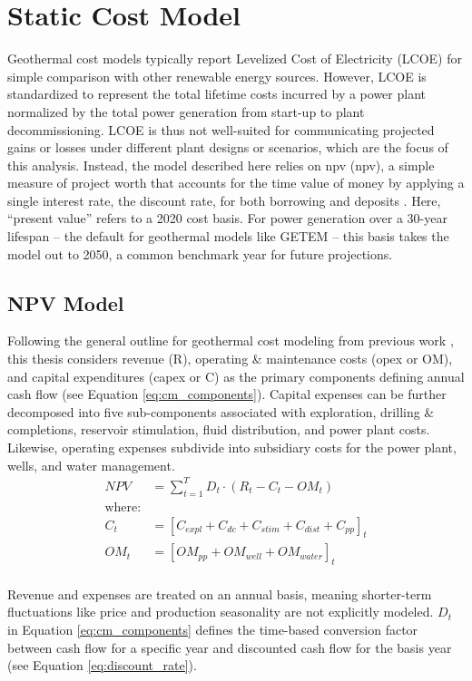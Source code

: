 \section{Static Cost Model}\label{ch4:cm_structure}
Geothermal cost models typically report Levelized Cost of Electricity (LCOE) for simple comparison with other renewable energy sources. However, LCOE is standardized to represent the total lifetime costs incurred by a power plant normalized by the total power generation from start-up to plant decommissioning. LCOE is thus not well-suited for communicating projected gains or losses under different plant designs or scenarios, which are the focus of this analysis. Instead, the model described here relies on \acrlong{npv} (\acrshort{npv}), a simple measure of project worth that accounts for the time value of money by applying a single interest rate, the discount rate, for both borrowing and deposits \citep[p.\ 195-215]{de_neufville_flexibility_2011}. Here, ``present value'' refers to a 2020 cost basis. For power generation over a 30-year lifespan -- the default for geothermal models like GETEM \citep{entingh_volume_2006} -- this basis takes the model out to 2050, a common benchmark year for future projections. 

\subsection{NPV Model}\label{ch4:cm_npv}
Following the general outline for geothermal cost modeling from previous work \citep[e.g.,][]{augustine_hydrothermal_2009, beckers_introducing_2013,tester_future_2006}, this thesis considers revenue (R), operating \& maintenance costs (\acrshort{opex} or OM), and capital expenditures (\acrshort{capex} or C) as the primary components defining annual cash flow (see Equation \ref{eq:cm_components}). Capital expenses can be further decomposed into five  sub-components associated with exploration, drilling \& completions, reservoir stimulation, fluid distribution, and power plant costs. Likewise, operating expenses subdivide into subsidiary costs for the power plant, wells, and water management.
\begin{equation}
    \label{eq:cm_components}
    \begin{aligned}
    NPV &= \sum_{t=1}^{T}D_t \cdot \left( R_t - C_t - OM_t \right)\\
    \text{where:}\\
    C_t &= \left[C_{expl} + C_{dc} + C_{stim} + C_{dist} + C_{pp}\right]_t\\
    OM_t &= \left[OM_{pp} + OM_{well} + OM_{water}\right]_t
    \end{aligned}
\end{equation}
\\
Revenue and expenses are treated on an annual basis, meaning shorter-term fluctuations like price and production seasonality are not explicitly modeled. $D_t$ in Equation \ref{eq:cm_components} defines the time-based conversion factor between cash flow for a specific year and discounted cash flow for the basis year (see Equation \ref{eq:discount_rate}).

